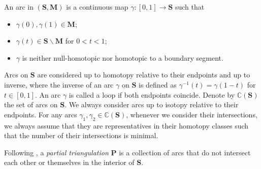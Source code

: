 \documentclass[a4paper,10pt]{amsart}
\theoremstyle{plain}          %
\theoremstyle{definition}
\def\SS{\mathbf{S}}
\def\Pf{\mathbf{P}}
\def\MM{\mathbf{M}}
\def\MM{\mathbf{M}}
\begin{document}
An arc in $(\SS,\MM)$ is a continuous map $\gamma:[0,1]\to \SS$ such that
\begin{itemize}
 \item $\gamma(0),\gamma(1)\in \MM$; 
 \item $\gamma(t)\in \SS\backslash \MM$ for $0<t<1$;
    \item $\gamma$ is neither null-homotopic nor homotopic to a boundary segment.
\end{itemize}
Arcs on $\SS$ are considered up to homotopy relative to their endpoints and up to inverse, where the inverse of an arc $\gamma$ on $\SS$ is defined as $\gamma^{-1}(t)= \gamma(1-t)$ for $t\in[0,1]$. An arc $\gamma$ is called a loop if both endpoints coincide. Denote by $\mathbb{C}(\SS)$ the set of arcs on $\SS$. 
We always consider arcs up to isotopy relative to their endpoints. For any arcs $\gamma_1, \gamma_2\in \mathbb{C}(\SS)$, whenever we consider their intersections, we always assume that they are representatives in their homotopy classes such that the number of their intersections is minimal.

Following \cite{BS}, a \emph{partial triangulation} $\Pf$ is a collection of arcs that do not intersect each other or themselves in the interior of $\SS$. 
\end{document}
